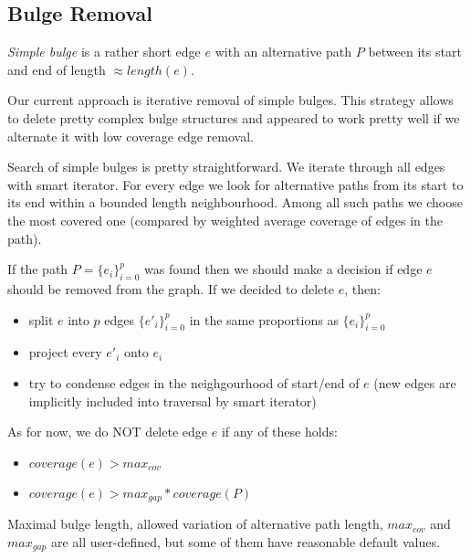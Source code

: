 \documentclass[12pt]{article}
\begin{document}
\subsection{Bulge Removal}
\textit{Simple bulge} is a rather short edge $e$ with an alternative path $P$ between its start and end of length $\approx length(e)$.

Our current approach is iterative removal of simple bulges. This strategy allows to delete pretty complex bulge structures and appeared to work pretty well if we alternate it with low coverage edge removal.

Search of simple bulges is pretty straightforward.
We iterate through all edges with smart iterator. For every edge we look for alternative paths from its start to its end within a bounded length neighbourhood.
Among all such paths we choose the most covered one (compared by weighted average coverage of edges in the path).  

If the path $P=\{e_i\}_{i=0}^{p}$ was found then we should make a decision if edge $e$ should be removed from the graph. If we decided to delete $e$, then:
\begin{itemize}
\item split $e$ into $p$ edges $\{e'_i\}_{i=0}^{p}$ in the same proportions as $\{e_i\}_{i=0}^{p}$
\item project every $e'_i$ onto $e_i$
\item try to condense edges in the neighgourhood of start/end of $e$ (new edges are implicitly included into traversal by smart iterator)
\end{itemize}

As for now, we do NOT delete edge $e$ if any of these holds:
\begin{itemize}
\item $coverage(e)>max_{cov}$
\item $coverage(e)>max_{gap}*coverage(P)$
\end{itemize}

Maximal bulge length, allowed variation of alternative path length, $max_{cov}$ and $max_{gap}$ are all user-defined, but some of them have reasonable default values.
\end{document}

